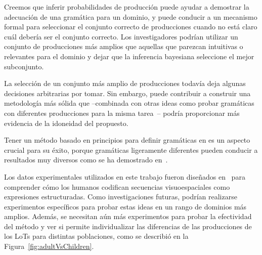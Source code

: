 Creemos que inferir probabilidades de producción puede ayudar a demostrar la adecuación de una gramática para un dominio, y puede conducir a un mecanismo formal para seleccionar el conjunto correcto de producciones cuando no está claro cuál debería ser el conjunto correcto. Los investigadores podrían utilizar un conjunto de producciones más amplios que aquellas que parezcan intuitivas o relevantes para el dominio y dejar que la inferencia bayesiana seleccione el mejor subconjunto.


La selección de un conjunto más amplio de producciones todavía deja algunas decisiones arbitrarias por tomar. Sin embargo, puede contribuir a construir una metodología más sólida que --combinada con otras ideas como probar gramáticas con diferentes producciones para la misma tarea~\cite{piantadosi2016logical}-- podría proporcionar más evidencia de la idoneidad del \lot propuesto.


Tener un método basado en principios para definir gramáticas en \lot es un aspecto crucial para su éxito, porque gramáticas ligeramente diferentes pueden conducir a resultados muy diversos como se ha demostrado en~\cite{piantadosi2016logical}.


Los datos experimentales utilizados en este trabajo fueron diseñados en~\cite{amalric2017language} para comprender cómo los humanos codifican secuencias visuoespaciales como expresiones estructuradas. Como investigaciones futuras, podrían realizarse experimentos específicos para probar estas ideas en un rango de dominios más amplios. Además, se necesitan aún más experimentos para probar la efectividad del método y ver si permite individualizar las diferencias de las producciones de los LoTs para distintas poblaciones, como se describió en la Figura~\ref{fig:adultVsChildren}.

